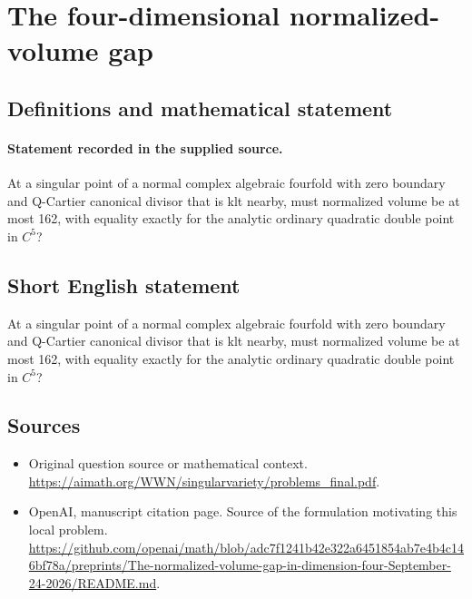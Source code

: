 \documentclass[11pt]{article}
\begin{document}
\section*{The four-dimensional normalized-volume gap}\label{30007052}
\subsection{Definitions and mathematical statement}
\paragraph{Statement recorded in the supplied source.}
At a singular point of a normal complex algebraic fourfold with zero boundary and Q-Cartier canonical divisor that is klt nearby, must normalized volume be at most 162, with equality exactly for the analytic ordinary quadratic double point in $C^{5}$?
\subsection{Short English statement}
At a singular point of a normal complex algebraic fourfold with zero boundary and Q-Cartier canonical divisor that is klt nearby, must normalized volume be at most 162, with equality exactly for the analytic ordinary quadratic double point in $C^{5}$?
\subsection{Sources}
\begin{itemize}
\item[S1] Original question source or mathematical context.
\url{https://aimath.org/WWN/singularvariety/problems_final.pdf}.
\item[S2] OpenAI, manuscript citation page. Source of the formulation motivating this local problem.
\url{https://github.com/openai/math/blob/adc7f1241b42e322a6451854ab7e4b4c146bf78a/preprints/The-normalized-volume-gap-in-dimension-four-September-24-2026/README.md}.
\end{itemize}
\end{document}
